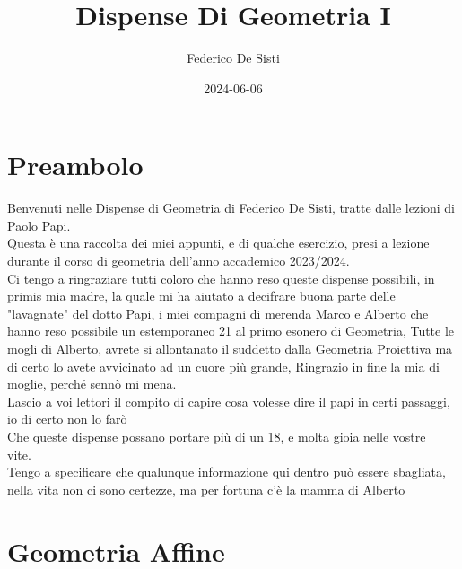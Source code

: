 \documentclass[12px]{article}
\title{Dispense Di Geometria I}
\date{2024-06-06}
\author{Federico De Sisti}
\begin{document}
	\maketitle
	\newpage
	\tableofcontents
	\newpage
	\section{Preambolo}
	Benvenuti nelle Dispense di Geometria di Federico De Sisti, tratte dalle lezioni di Paolo Papi.\\[10px]
	Questa è una raccolta dei miei appunti, e di qualche esercizio, presi a lezione durante il corso di geometria dell'anno accademico 2023/2024.\\[10px]
	Ci tengo a ringraziare tutti coloro che hanno reso queste dispense possibili, in primis mia madre, la quale mi ha aiutato a decifrare buona parte delle "lavagnate" del dotto Papi, i miei compagni di merenda Marco e Alberto che hanno reso possibile un estemporaneo 21 al primo esonero di Geometria, Tutte le mogli di Alberto, avrete si allontanato il suddetto dalla Geometria Proiettiva ma di certo lo avete avvicinato ad un cuore più grande, Ringrazio in fine la mia di moglie, perché sennò mi mena.\\[10px]
	Lascio a voi lettori il compito di capire cosa volesse dire il papi in certi passaggi, io di certo non lo farò\\[10px]
	Che queste dispense possano portare più di un 18, e molta gioia nelle vostre vite.\vfill \ \\
	Tengo a specificare che qualunque informazione qui dentro può essere sbagliata, nella vita non ci sono certezze, ma per fortuna c'è la mamma di Alberto
	\newpage
	\section{Geometria Affine}
\end{document}

